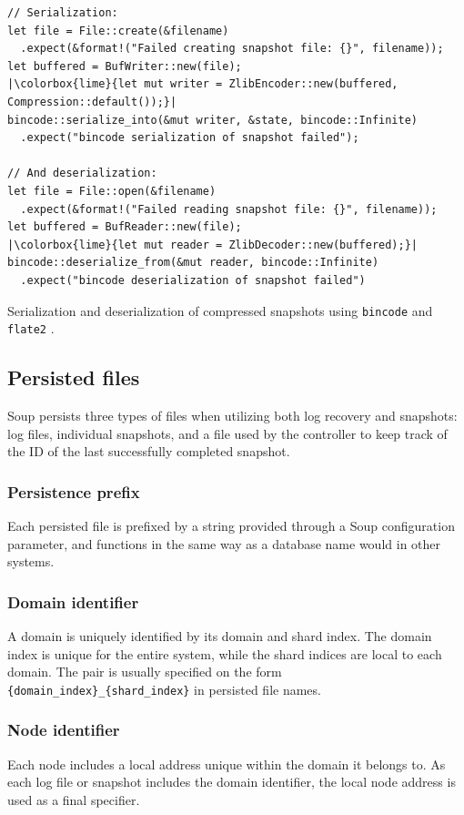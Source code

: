 \documentclass[b5paper]{report}
\begin{document}
\begin{listing}[H]
  \begin{verbatim}
// Serialization:
let file = File::create(&filename)
  .expect(&format!("Failed creating snapshot file: {}", filename));
let buffered = BufWriter::new(file);
|\colorbox{lime}{let mut writer = ZlibEncoder::new(buffered, Compression::default());}|
bincode::serialize_into(&mut writer, &state, bincode::Infinite)
  .expect("bincode serialization of snapshot failed");

// And deserialization:
let file = File::open(&filename)
  .expect(&format!("Failed reading snapshot file: {}", filename));
let buffered = BufReader::new(file);
|\colorbox{lime}{let mut reader = ZlibDecoder::new(buffered);}|
bincode::deserialize_from(&mut reader, bincode::Infinite)
  .expect("bincode deserialization of snapshot failed")
  \end{verbatim}
  \caption{
    Serialization and deserialization of compressed snapshots using
    \texttt{bincode} \cite{bincode} and \texttt{flate2} \cite{flate2}.
  }
\end{listing}

\subsection{Persisted files}
Soup persists three types of files when utilizing both log recovery and
snapshots: log files, individual snapshots, and a file used by the controller to
keep track of the ID of the last successfully completed snapshot.

\subsubsection{Persistence prefix}
Each persisted file is prefixed by a string provided through a Soup
configuration parameter, and functions in the same way as a database name would
in other systems.

\subsubsection{Domain identifier}
A domain is uniquely identified by its domain and shard index. The domain
index is unique for the entire system, while the shard indices are local to each
domain. The pair is usually specified on the form
\texttt{\{domain\_index\}\_\{shard\_index\}} in persisted file names.

\subsubsection{Node identifier}
Each node includes a local address unique within the domain it belongs to. As
each log file or snapshot includes the domain identifier, the local node address
is used as a final specifier.
\end{document}

